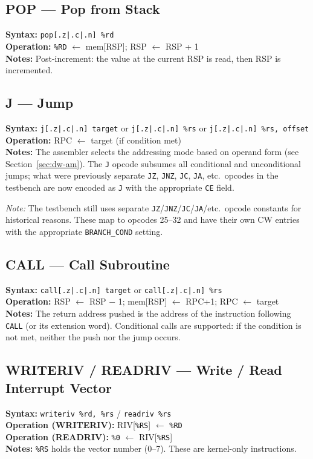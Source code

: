 \documentclass[a4paper,12pt]{report}
\newcommand{\asm}[1]{\texttt{#1}}
\newcommand{\field}[1]{\texttt{\small #1}}
\newcommand{\reg}[1]{\texttt{\%#1}}
\begin{document}
\subsection*{POP --- Pop from Stack}
\textbf{Syntax:} \asm{pop[.z|.c|.n] \%rd} \\
\textbf{Operation:} \reg{RD} $\leftarrow$ mem[RSP]; RSP $\leftarrow$ RSP + 1 \\
\textbf{Notes:} Post-increment: the value at the current RSP is read, then RSP is incremented.

\subsection*{J --- Jump}
\textbf{Syntax:} \asm{j[.z|.c|.n] target} or \asm{j[.z|.c|.n] \%rs} or \asm{j[.z|.c|.n] \%rs, offset} \\
\textbf{Operation:} RPC $\leftarrow$ target (if condition met) \\
\textbf{Notes:} The assembler selects the addressing mode based on operand form (see Section~\ref{sec:dw-am}). The \field{J} opcode subsumes all conditional and unconditional jumps; what were previously separate \asm{JZ}, \asm{JNZ}, \asm{JC}, \asm{JA}, etc.\ opcodes in the testbench are now encoded as \asm{J} with the appropriate \field{CE} field.

\textit{Note:} The testbench still uses separate \asm{JZ}/\asm{JNZ}/\asm{JC}/\asm{JA}/etc.\ opcode constants for historical reasons. These map to opcodes 25--32 and have their own CW entries with the appropriate \field{BRANCH\_COND} setting.

\subsection*{CALL --- Call Subroutine}
\textbf{Syntax:} \asm{call[.z|.c|.n] target} or \asm{call[.z|.c|.n] \%rs} \\
\textbf{Operation:} RSP $\leftarrow$ RSP $-$ 1; mem[RSP] $\leftarrow$ RPC+1; RPC $\leftarrow$ target \\
\textbf{Notes:} The return address pushed is the address of the instruction following \asm{CALL} (or its extension word). Conditional calls are supported: if the condition is not met, neither the push nor the jump occurs.

\subsection*{WRITERIV / READRIV --- Write / Read Interrupt Vector}
\textbf{Syntax:} \asm{writeriv \%rd, \%rs} / \asm{readriv \%rs} \\
\textbf{Operation (WRITERIV):} RIV[\reg{RS}] $\leftarrow$ \reg{RD} \\
\textbf{Operation (READRIV):} \reg{0} $\leftarrow$ RIV[\reg{RS}] \\
\textbf{Notes:} \reg{RS} holds the vector number (0--7). These are kernel-only instructions.
\end{document}
